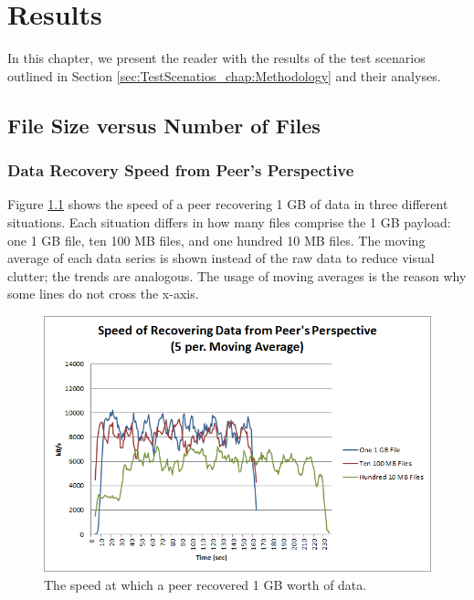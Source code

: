 \documentclass[12pt]{report}
\begin{document}
\chapter{Results} \label{chap:Results}

In this chapter, we present the reader with the results of the test scenarios outlined in Section \ref{sec:TestScenatios_chap:Methodology} and their analyses.

\section{File Size versus Number of Files} \label{sec:FileSizeversusNumberofFiles_chap:Results}

\subsection{Data Recovery Speed from Peer's Perspective} \label{subsec:DataRecoverySpeedfromPeersPerspective}

Figure \ref{fig:PeerRecoverySpeed} shows the speed of a peer recovering 1 GB of data in three different situations. Each situation differs in how many files comprise the 1 GB payload: one 1 GB file, ten 100 MB files, and one hundred 10 MB files. The moving average of each data series is shown instead of the raw data to reduce visual clutter; the trends are analogous. The usage of moving averages is the reason why some lines do not cross the x-axis.

\begin{figure}
  \centerline{\includegraphics[scale=1]{figures/PeerRecoverySpeed}}
  \caption{The speed at which a peer recovered 1 GB worth of data. \label{fig:PeerRecoverySpeed}}
\end{figure}
\end{document}
